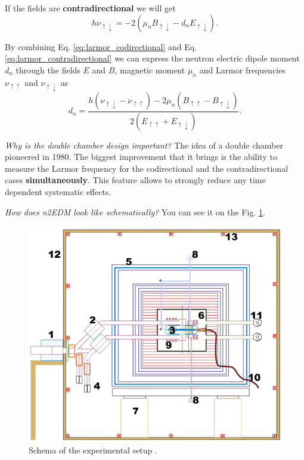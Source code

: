 If the fields are \textbf{contradirectional} we will get
\begin{equation}
	h\nu_{\uparrow \downarrow} = -2 \left( \mu_n B_{\uparrow \downarrow} - d_n E_{\uparrow \downarrow} \right).
	\label{eq:larmor_contradirectional}
\end{equation}

By combining Eq. \ref{eq:larmor_codirectional} and Eq. \ref{eq:larmor_contradirectional} we can express the neutron electric dipole moment $d_n$ through the fields $E$ and $B$, magnetic moment $\mu_n$ and Larmor frequencies $\nu_{\uparrow \uparrow}$ and $\nu_{\uparrow \downarrow}$ as
\begin{equation}
	d_n = \frac{h \left( \nu_{\uparrow \downarrow} - \nu_{\uparrow \uparrow} \right) - 2 \mu_n \left( B_{\uparrow \uparrow} - B_{\uparrow \downarrow} \right)}{2 \left( E_{\uparrow \uparrow} + E_{\uparrow \downarrow} \right)}.
\end{equation}

\textit{Why is the double chamber design important?} The idea of a double chamber pioneered \cite{Altarev1980} in 1980. The biggest improvement that it brings is the ability to measure the Larmor frequency for the codirectional and the contradirectional cases \textbf{simultaneously}. This feature allows to strongly reduce \cite{Abel2018} any time dependent systematic effects.

\textit{How does n2EDM look like schematically?} You can see it on the Fig. \ref{fig:n2edm_schema}.

\begin{figure}[h]
	\centering
	\includegraphics[width=.82\textwidth]{img/n2edm_schema}
	\caption{Schema of the experimental setup \cite{Abel2018}.}
	\label{fig:n2edm_schema}
\end{figure}

